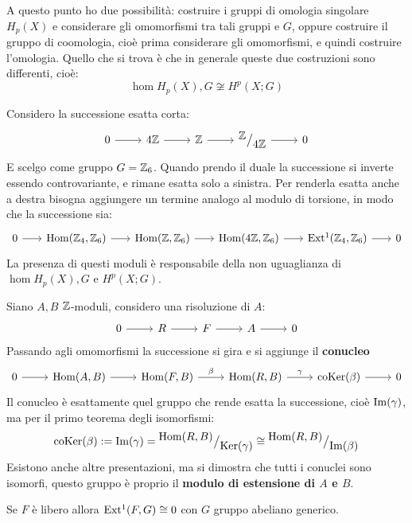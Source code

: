 A questo punto ho due possibilità: costruire i gruppi di omologia singolare
$ H_p(X) $ e considerare gli omomorfismi tra tali gruppi e $ G $, oppure
costruire il gruppo di coomologia, cioè prima considerare gli omomorfismi, e
quindi costruire l'omologia. Quello che si trova è che in generale queste
due costruzioni sono differenti, cioè:
\[
  \hom{H_p(X), G} \not \cong H^p(X ; G)
\]

\begin{example}
  Considero la successione esatta corta:
  \[
    \begin{tikzcd}
      0 \rar & 4 \Z \rar & \Z \rar & \quot{\Z}{4\Z} \rar & 0
    \end{tikzcd}
  \]
  E scelgo come gruppo $ G = \mathbb{Z}_6 $.
  Quando prendo il duale la successione si inverte essendo controvariante,
  e rimane esatta solo a sinistra. Per renderla esatta anche a destra bisogna
  aggiungere un termine analogo al modulo di torsione, in modo che la successione
  sia:
  \[
    \begin{tikzcd}[nodes = {column sep = 18 pt}]
      0 \rar & \hom{\Z_4, \Z_6} \rar & \hom{\Z, \Z_6} \rar & \hom{4\Z, \Z_6} \rar & \ext{\Z_4, \Z_6} \rar & 0
    \end{tikzcd}
  \]
  La presenza di questi moduli è responsabile della non uguaglianza di $ \hom{H_p(X), G} $ e $ H^p(X ; G) $.
\end{example}
\begin{definition}
  Siano $ A, B $ $ \mathbb{Z} $-moduli, considero una risoluzione di $ A $:
  \[
    \begin{tikzcd}
      0 \rar & R \rar & F \rar & A \rar & 0
    \end{tikzcd}
  \]
  Passando agli omomorfismi la successione si gira e si aggiunge il \textbf{conucleo}
  \[
    \begin{tikzcd}
      0 \rar & \hom{A,B} \rar & \hom{F,B} \rar{\beta} & \hom{R,B} \rar{\gamma} & \coker{\beta} \rar & 0
    \end{tikzcd}
  \]
  Il conucleo è esattamente quel gruppo che rende esatta la successione, cioè
  $ \mathrm{Im}( \gamma ) $, ma per il primo teorema degli isomorfismi:
  \[
    \mathrm{coKer}( \beta) := \mathrm{Im}( \gamma ) = {^{\textstyle \mathrm{Hom}( R,B)}\big/_{\textstyle \mathrm{Ker}( \gamma)}} \cong {^{\textstyle \mathrm{Hom}( R,B)}\big/_{\textstyle \mathrm{Im}( \beta )}}
  \]
  Esistono anche altre presentazioni, ma si dimostra che tutti i conuclei sono isomorfi,
  questo gruppo è proprio il \textbf{modulo di estensione di $ A $ e $ B $}.
\end{definition}
\begin{lemma}
  Se $ F $ è libero allora $ \mathrm{Ext^1}( F, G) \cong 0 $ con $ G $ gruppo abeliano generico.
\end{lemma}
